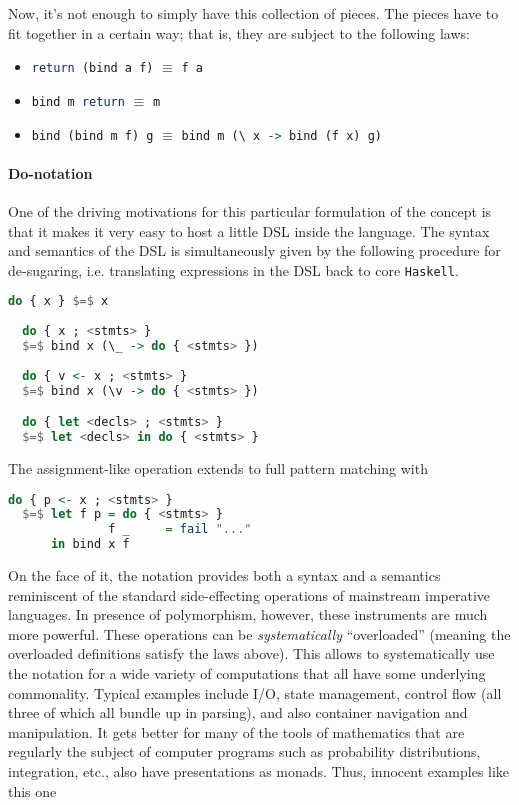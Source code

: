 Now, it's not enough to simply have this collection of pieces. The
pieces have to fit together in a certain way; that is, they are
subject to the following laws:

\begin{itemize}
  \item \lstinline[language=Haskell]!return (bind a f)! $\equiv$ \lstinline[language=Haskell]!f a! %
  \item \lstinline[language=Haskell]!bind m return! $\equiv$ \lstinline[language=Haskell]!m! %
  \item \lstinline[language=Haskell]!bind (bind m f) g! $\equiv$ \lstinline[language=Haskell]!bind m (\ x -> bind (f x) g)! %
\end{itemize}

\paragraph{Do-notation}
One of the driving motivations for this particular formulation of the
concept is that it makes it very easy to host a little DSL inside the
language. The syntax and semantics of the DSL is simultaneously given
by the following procedure for de-sugaring, i.e. translating
expressions in the DSL back to core \texttt{Haskell}.

\break
\begin{lstlisting}[language=Haskell,mathescape=true,frame=single,caption={do-notation de-sugaring},captionpos=b]
  do { x } $=$ x
 
  do { x ; <stmts> }
  $=$ bind x (\_ -> do { <stmts> })
 
  do { v <- x ; <stmts> }
  $=$ bind x (\v -> do { <stmts> }) 

  do { let <decls> ; <stmts> }
  $=$ let <decls> in do { <stmts> }
\end{lstlisting} 

The assignment-like operation extends to full pattern matching with

\begin{lstlisting}[language=Haskell,mathescape=true]
  do { p <- x ; <stmts> }
  $=$ let f p = do { <stmts> }
              f _     = fail "..."
      in bind x f
\end{lstlisting}

On the face of it, the notation provides both a syntax and a semantics
reminiscent of the standard side-effecting operations of mainstream
imperative languages. In presence of polymorphism, however, these
instruments are much more powerful. These operations can be
\emph{systematically} ``overloaded'' (meaning the overloaded
definitions satisfy the laws above). This allows to systematically use
the notation for a wide variety of computations that all have some
underlying commonality. Typical examples include I/O, state
management, control flow (all three of which all bundle up in
parsing), and also container navigation and manipulation. It gets
better for many of the tools of mathematics that are regularly the
subject of computer programs such as probability distributions,
integration, etc., also have presentations as monads. Thus, innocent
examples like this one

